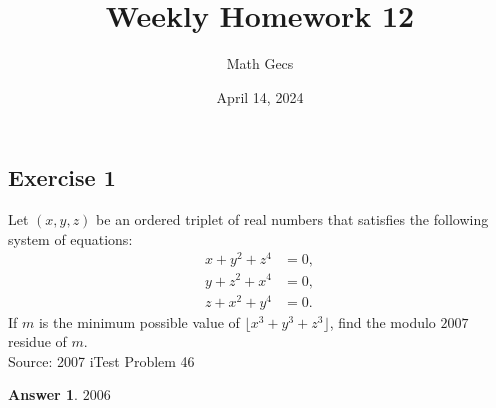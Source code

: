 \documentclass[12pt]{article}
\title{Weekly Homework 12}
\author{Math Gecs}
\date{April 14, 2024}
\newtheorem*{answer*}{Answer}
\begin{document}
\maketitle

\subsection*{Exercise 1}
Let $(x,y,z)$ be an ordered triplet of real numbers that satisfies the following system of equations: 
$$\begin{align*}x+y^2+z^4&=0,\\y+z^2+x^4&=0,\\z+x^2+y^4&=0.\end{align*}$$
If $m$ is the minimum possible value of $\lfloor x^3+y^3+z^3\rfloor$, find the modulo $2007$ residue of $m$.
\\

Source: 2007 iTest Problem 46\\

\begin{answer*}
$\boxed{2006}$
\end{answer*}
\end{document}
